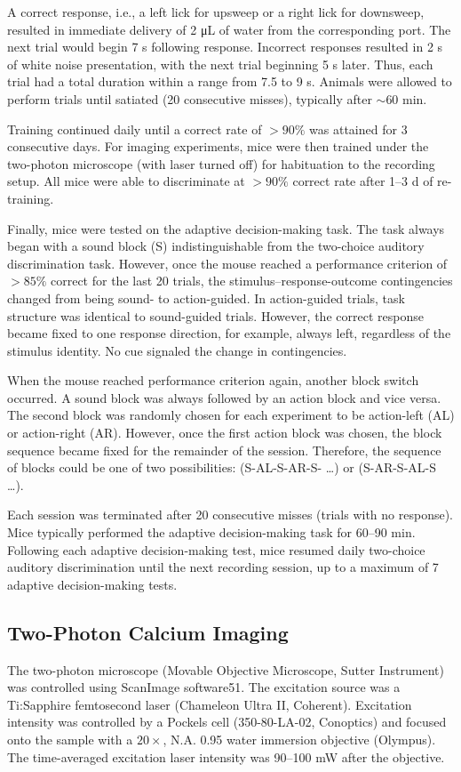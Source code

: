 A correct response, i.e., a left lick for upsweep or a right lick for downsweep, resulted in immediate delivery of 2 \si{\uL} of water from the corresponding port. The next trial would begin 7 s following response. Incorrect responses resulted in 2 s of white noise presentation, with the next trial beginning 5 s later. Thus, each trial had a total duration within a range from 7.5 to 9 s. Animals were allowed to perform trials until satiated (20 consecutive misses), typically after $\sim 60$ min. 

Training continued daily until a correct rate of $>90\%$ was attained for 3 consecutive days. For imaging experiments, mice were then trained under the two-photon microscope (with laser turned off) for habituation to the recording setup. All mice were able to discriminate at $>90\%$ correct rate after 1--3 d of re-training. 

Finally, mice were tested on the adaptive decision-making task. The task always began with a sound block (S) indistinguishable from the two-choice auditory discrimination task. However, once the mouse reached a performance criterion of $>85\%$ correct for the last 20 trials, the stimulus–response-outcome contingencies changed from being sound- to action-guided. In action-guided trials, task structure was identical to sound-guided trials. However, the correct response became fixed to one response direction, for example, always left, regardless of the stimulus identity. No cue signaled the change in contingencies. 

When the mouse reached performance criterion again, another block switch occurred. A sound block was always followed by an action block and vice versa. The second block was randomly chosen for each experiment to be action-left (AL) or action-right (AR). However, once the first action block was chosen, the block sequence became fixed for the remainder of the session. Therefore, the sequence of blocks could be one of two possibilities: (S-AL-S-AR-S- \ldots) or (S-AR-S-AL-S \ldots). 

Each session was terminated after 20 consecutive misses (trials with no response). Mice typically performed the adaptive decision-making task for 60--90 min. Following each adaptive decision-making test, mice resumed daily two-choice auditory discrimination until the next recording session, up to a maximum of 7 adaptive decision-making tests.

\subsection*{Two-Photon Calcium Imaging}
The two-photon microscope (Movable Objective Microscope, Sutter Instrument) was controlled using ScanImage software51. The excitation source was a Ti:Sapphire femtosecond laser (Chameleon Ultra II, Coherent). Excitation intensity was controlled by a Pockels cell (350-80-LA-02, Conoptics) and focused onto the sample with a $20\times$, N.A. 0.95 water immersion objective (Olympus). The time-averaged excitation laser intensity was 90--100 mW after the objective. 

